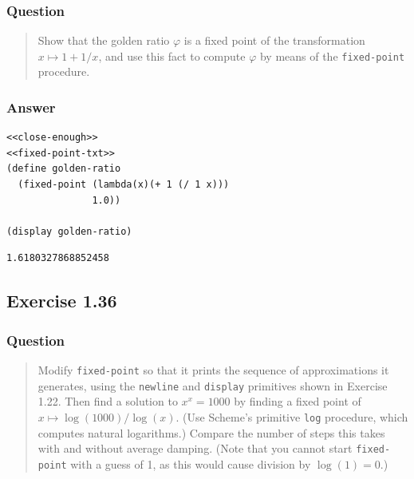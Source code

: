 \documentclass[final,fleqn,titlepage,twoside]{article}
\begin{document}
\subsubsection{Question}
\label{sec:org6abc939}
\begin{quote}
Show that the golden ratio \(\varphi\) is a fixed point of the transformation
\(x \mapsto 1 + 1 / x\), and use this fact to compute \(\varphi\) by means of
the \texttt{fixed-point} procedure.
\end{quote}

\subsubsection{Answer}
\label{sec:org561994c}
\begin{verbatim}
<<close-enough>>
<<fixed-point-txt>>
(define golden-ratio
  (fixed-point (lambda(x)(+ 1 (/ 1 x)))
               1.0))

(display golden-ratio)
\end{verbatim}

\begin{verbatim}
1.6180327868852458
\end{verbatim}

\subsection{Exercise 1.36}
\label{sec:org8adc9bc}
\subsubsection{Question}
\label{sec:orgc35c696}
\begin{quote}
Modify \texttt{fixed-point} so that it prints the sequence of approximations
it generates, using the \texttt{newline} and \texttt{display} primitives
shown in Exercise 1.22. Then find a solution to \(x^x = 1000\) by finding a
fixed point of \(x \mapsto \log(1000) / \log(x)\). (Use Scheme's primitive
\texttt{log} procedure, which computes natural logarithms.) Compare the
number of steps this takes with and without average damping. (Note that you
cannot start \texttt{fixed-point} with a guess of 1, as this would cause
division by \(\log(1) = 0\).)
\end{quote}
\end{document}
